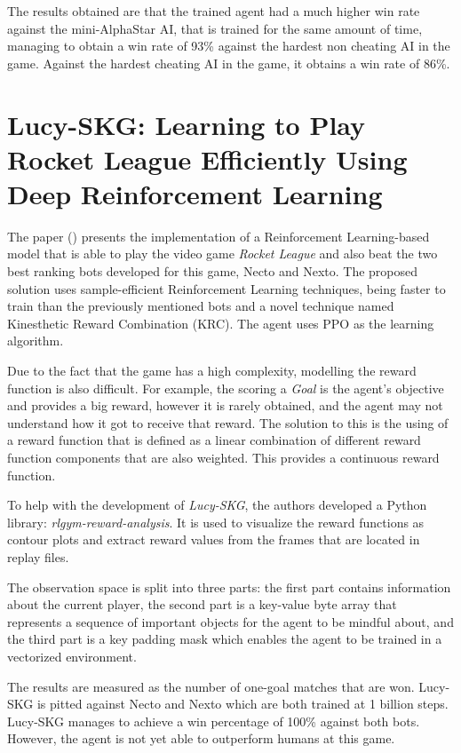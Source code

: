 The results obtained are that the trained agent had a much higher win rate against the mini-AlphaStar AI, that is trained for the same amount of time, managing to obtain a win rate of 93\% against the hardest non cheating AI in the game. Against the hardest cheating AI in the game, it obtains a win rate of 86\%.



\section{Lucy-SKG: Learning to Play Rocket League Efficiently Using Deep Reinforcement Learning}
The paper (\cite{moschopoulos2023lucyskgrocketleague}) presents the implementation of a Reinforcement Learning-based model that is able to play the video game \emph{Rocket League} and also beat the two best ranking bots developed for this game, Necto and Nexto. The proposed solution uses sample-efficient Reinforcement Learning techniques, being faster to train than the previously mentioned bots and a novel technique named Kinesthetic Reward Combination (KRC). The agent uses PPO as the learning algorithm.

Due to the fact that the game has a high complexity, modelling the reward function is also difficult. For example, the scoring a \emph{Goal} is the agent's objective and provides a big reward, however it is rarely obtained, and the agent may not understand how it got to receive that reward. The solution to this is the using of a reward function that is defined as a linear combination of different reward function components that are also weighted. This provides a continuous reward function.

To help with the development of \emph{Lucy-SKG}, the authors developed a Python library: \emph{rlgym-reward-analysis}. It is used to visualize the reward functions as contour plots and extract reward values from the frames that are located in replay files.

The observation space is split into three parts: the first part contains information about the current player, the second part is a key-value byte array that represents a sequence of important objects for the agent to be mindful about, and the third part is a key padding mask which enables the agent to be trained in a vectorized environment.

The results are measured as the number of one-goal matches that are won. Lucy-SKG is pitted against Necto and Nexto which are both trained at 1 billion steps. Lucy-SKG manages to achieve a win percentage of 100\% against both bots. However, the agent is not yet able to outperform humans at this game.



